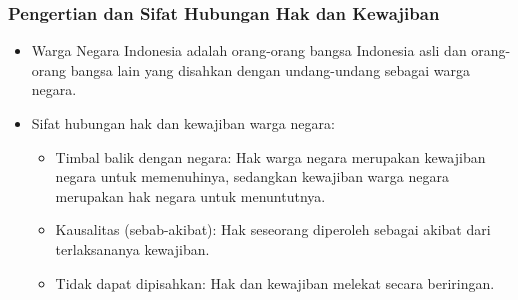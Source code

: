 \subsubsection{Pengertian dan Sifat Hubungan Hak dan Kewajiban}
\begin{itemize}
\item Warga Negara Indonesia adalah orang-orang bangsa Indonesia asli dan orang-orang bangsa lain yang disahkan dengan undang-undang sebagai warga negara.
\item Sifat hubungan hak dan kewajiban warga negara:
  \begin{itemize}
  \item Timbal balik dengan negara: Hak warga negara merupakan kewajiban negara untuk memenuhinya, sedangkan kewajiban warga negara merupakan hak negara untuk menuntutnya.
  \item Kausalitas (sebab-akibat): Hak seseorang diperoleh sebagai akibat dari terlaksananya kewajiban.
  \item Tidak dapat dipisahkan: Hak dan kewajiban melekat secara beriringan.
  \end{itemize}
\end{itemize}

